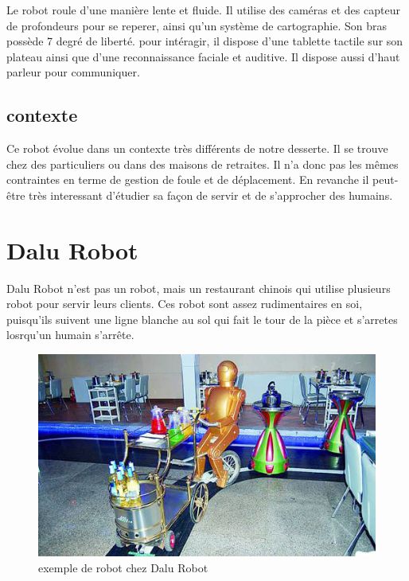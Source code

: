 Le robot roule d'une manière lente et fluide. Il utilise des caméras et des capteur de profondeurs pour se reperer, ainsi qu'un système de cartographie. Son bras possède 7 degré de liberté. pour intéragir, il dispose d'une tablette tactile sur son plateau ainsi que d'une reconnaissance faciale et auditive. Il dispose aussi d'haut parleur pour communiquer.

\subsection{contexte}

Ce robot évolue dans un contexte très différents de notre desserte. Il se trouve chez des particuliers ou dans des maisons de retraites. Il n'a donc pas les mêmes contraintes en terme de gestion de foule et de déplacement. En revanche il peut-être très interessant d'étudier sa façon de servir et de s'approcher des humains.

\newpage

\section{Dalu Robot}

Dalu Robot n'est pas un robot, mais un restaurant chinois qui utilise plusieurs robot pour servir leurs clients. Ces robot sont assez rudimentaires en soi, puisqu'ils suivent une ligne blanche au sol qui fait le tour de la pièce et s'arretes losrqu'un humain s'arrête.

\begin{figure}[h]
\begin{center}
\includegraphics[scale=0.55]{Images/dalu-robot-1.jpg}
\caption{exemple de robot chez Dalu Robot}
\label{exemple de robot chez Dalu Robot}
\end{center}
\end{figure}


